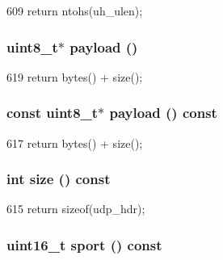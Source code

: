 \begin{DoxyCode}
609 { return ntohs(uh_ulen); }
\end{DoxyCode}
\hypertarget{structNet_1_1UdpHdr_a79ce21e3572e587b71de7af1ac640b6f}{
\subsubsection[{payload}]{\setlength{\rightskip}{0pt plus 5cm}uint8\_\-t$\ast$ payload ()}}
\label{structNet_1_1UdpHdr_a79ce21e3572e587b71de7af1ac640b6f}



\begin{DoxyCode}
619 { return bytes() + size(); }
\end{DoxyCode}
\hypertarget{structNet_1_1UdpHdr_a5f0d069ddb9d067af9e94963bd1fc7a2}{
\subsubsection[{payload}]{\setlength{\rightskip}{0pt plus 5cm}const uint8\_\-t$\ast$ payload () const}}
\label{structNet_1_1UdpHdr_a5f0d069ddb9d067af9e94963bd1fc7a2}



\begin{DoxyCode}
617 { return bytes() + size(); }
\end{DoxyCode}
\hypertarget{structNet_1_1UdpHdr_ab8e4e3e2a7bf18888b71bdf9dda0770b}{
\subsubsection[{size}]{\setlength{\rightskip}{0pt plus 5cm}int size () const}}
\label{structNet_1_1UdpHdr_ab8e4e3e2a7bf18888b71bdf9dda0770b}



\begin{DoxyCode}
615 { return sizeof(udp_hdr); }
\end{DoxyCode}
\hypertarget{structNet_1_1UdpHdr_ac8b130feab6c3c849b62ee42ad32d6c2}{
\subsubsection[{sport}]{\setlength{\rightskip}{0pt plus 5cm}uint16\_\-t sport () const}}
\label{structNet_1_1UdpHdr_ac8b130feab6c3c849b62ee42ad32d6c2}



